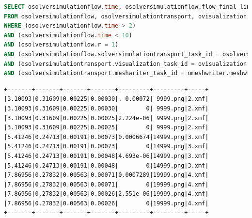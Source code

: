 \begin{lstlisting}[language=sql,deletendkeywords={TIME},deletendkeywords={TIME},label={lst:experiments-3a-sql},caption={[Código em SQL gerado na consulta~\#3A]Código em SQL gerado na consulta~\#3A (tempo médio: 31,80~ms).}]
SELECT osolversimulationflow.time, osolversimulationflow.flow_final_linear_residual, osolversimulationflow.flow_norm_delta_u, osolversimulationtransport.transport_final_linear_residual, osolversimulationtransport.transport_norm_delta_u, ovisualization.png, omeshwriter.xdmf
FROM osolversimulationflow, osolversimulationtransport, ovisualization, omeshwriter
WHERE (osolversimulationflow.time > 2) 
AND (osolversimulationflow.time < 10) 
AND (osolversimulationflow.r = 1) 
AND (osolversimulationflow.solversimulationtransport_task_id = osolversimulationtransport.solversimulationtransport_task_id) 
AND (osolversimulationtransport.visualization_task_id = ovisualization.visualization_task_id) 
AND (osolversimulationtransport.meshwriter_task_id = omeshwriter.meshwriter_task_id);
\end{lstlisting}

\begin{lstlisting}[language=sqlresults,label={lst:experiments-3a-sqlresults},caption={[Versão simplificada dos resultados da consulta \#3A.]Resultados da consulta \#3A (12 tuplas, tempo médio: 5,11~ms).}]
+-------+-------+-------+-------+---------+---------+-----+
|3.10093|0.31609|0.00225|0.00030|. 0.00072| 9999.png|2.xmf|
|3.10093|0.31609|0.00225|0.00030|        0| 9999.png|2.xmf|
|3.10093|0.31609|0.00225|0.00025|2.224e-06| 9999.png|2.xmf|
|3.10093|0.31609|0.00225|0.00025|        0| 9999.png|2.xmf|
|5.41246|0.24713|0.00191|0.00073|0.0006674|14999.png|3.xmf|
|5.41246|0.24713|0.00191|0.00073|        0|14999.png|3.xmf|
|5.41246|0.24713|0.00191|0.00048|4.693e-06|14999.png|3.xmf|
|5.41246|0.24713|0.00191|0.00048|        0|14999.png|3.xmf|
|7.86956|0.27832|0.00563|0.00071|0.0007289|19999.png|4.xmf|
|7.86956|0.27832|0.00563|0.00071|        0|19999.png|4.xmf|
|7.86956|0.27832|0.00563|0.00026|2.551e-06|19999.png|4.xmf|
|7.86956|0.27832|0.00563|0.00026|        0|19999.png|4.xmf|
+-------+-------+-------+-------+---------+---------+-----+
\end{lstlisting}


